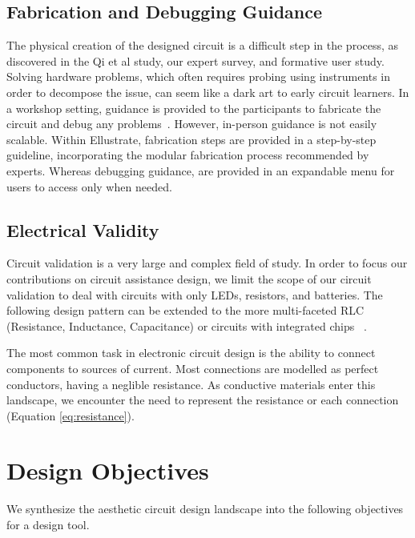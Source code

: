 \documentclass{sigchi}
\begin{document}
\subsection{Fabrication and Debugging Guidance}
  The physical creation of the designed circuit is a difficult step in the process, as discovered in the Qi et al study, our expert survey, and formative user study. Solving hardware problems, which often requires probing using instruments in order to decompose the issue, can seem like a dark art to early circuit learners. In a workshop setting, guidance is provided to the participants to fabricate the circuit and debug any problems~\cite{qi_sketching_2014}. However, in-person guidance is not easily scalable. Within Ellustrate, fabrication steps are provided in a step-by-step guideline, incorporating the modular fabrication process recommended by experts. Whereas debugging guidance, are provided in an expandable menu for users to access only when needed. 


\subsection{Electrical Validity}
  Circuit validation is a very large and complex field of study. In order to focus our contributions on circuit assistance design, we limit the scope of our circuit validation to deal with circuits with only LEDs, resistors, and batteries. The following design pattern can be extended to the more multi-faceted RLC (Resistance, Inductance, Capacitance) or circuits with integrated chips ~\cite{mellis_microcontrollers_2013}.

  The most common task in electronic circuit design is the ability to connect components to sources of current. Most connections are modelled as perfect conductors, having a neglible resistance. As conductive materials enter this landscape, we encounter the need to represent the resistance or each connection (Equation \ref{eq:resistance}).


\section{Design Objectives}
  We synthesize the aesthetic circuit design landscape into the following objectives for a design tool. 
    
\end{document}
